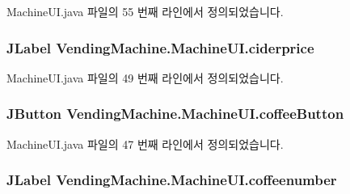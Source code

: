 Machine\+U\+I.\+java 파일의 55 번째 라인에서 정의되었습니다.

\subsubsection[{\texorpdfstring{ciderprice}{ciderprice}}]{\setlength{\rightskip}{0pt plus 5cm}J\+Label Vending\+Machine.\+Machine\+U\+I.\+ciderprice\hspace{0.3cm}{\ttfamily [private]}}\hypertarget{class_vending_machine_1_1_machine_u_i_a2e27dccbce68830250c1191a52c386a1}{}\label{class_vending_machine_1_1_machine_u_i_a2e27dccbce68830250c1191a52c386a1}


Machine\+U\+I.\+java 파일의 49 번째 라인에서 정의되었습니다.

\subsubsection[{\texorpdfstring{coffee\+Button}{coffeeButton}}]{\setlength{\rightskip}{0pt plus 5cm}J\+Button Vending\+Machine.\+Machine\+U\+I.\+coffee\+Button\hspace{0.3cm}{\ttfamily [private]}}\hypertarget{class_vending_machine_1_1_machine_u_i_acf9d7af6407e22aaa5e8d08e2ea2e07e}{}\label{class_vending_machine_1_1_machine_u_i_acf9d7af6407e22aaa5e8d08e2ea2e07e}


Machine\+U\+I.\+java 파일의 47 번째 라인에서 정의되었습니다.

\subsubsection[{\texorpdfstring{coffeenumber}{coffeenumber}}]{\setlength{\rightskip}{0pt plus 5cm}J\+Label Vending\+Machine.\+Machine\+U\+I.\+coffeenumber\hspace{0.3cm}{\ttfamily [private]}}\hypertarget{class_vending_machine_1_1_machine_u_i_a56d029e587c699de6b3d8f3f2c5c3ddb}{}\label{class_vending_machine_1_1_machine_u_i_a56d029e587c699de6b3d8f3f2c5c3ddb}


